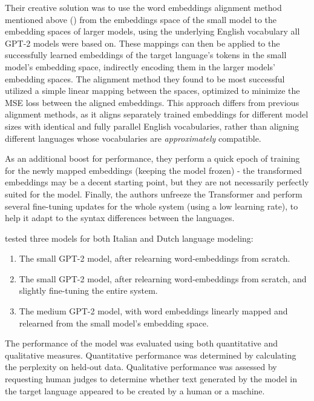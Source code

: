 \documentclass{article}
\begin{document}
\medskip
\noindent
Their creative solution was to use the word embeddings alignment method mentioned above (\citet{rudertheman}) from the embeddings space of the small model to the embedding spaces of larger models, using the underlying English vocabulary all GPT-2 models were based on. These mappings can then be applied to the successfully learned embeddings of the target language's tokens in the small model's embedding space, indirectly encoding them in the larger models' embedding spaces. The alignment method they found to be most successful utilized a simple linear mapping between the spaces, optimized to minimize the MSE loss between the aligned embeddings. This approach differs from previous alignment methods, as it aligns separately trained embeddings for different model sizes with identical and fully parallel English vocabularies, rather than aligning different languages whose vocabularies are \emph{approximately} compatible.

\medskip
\noindent
As an additional boost for performance, they perform a quick epoch of training for the newly mapped embeddings (keeping the model frozen) - the transformed embeddings may be a decent starting point, but they are not necessarily perfectly suited for the model. Finally, the authors unfreeze the Transformer and perform several fine-tuning updates for the whole system (using a low learning rate), to help it adapt to the syntax differences between the languages.

\medskip
\noindent
\citet{deVries2020recycle} tested three models for both Italian and Dutch language modeling:
\begin{enumerate}
    \item
        The small GPT-2 model, after relearning word-embeddings from scratch.
    \item
        The small GPT-2 model, after relearning word-embeddings from scratch, and slightly fine-tuning the entire system.
    \item
        The medium GPT-2 model, with word embeddings linearly mapped and relearned from the small model's embedding space.
\end{enumerate}

\medskip
\noindent
The performance of the model was evaluated using both quantitative and qualitative measures. Quantitative performance was determined by calculating the perplexity on held-out data. Qualitative performance was assessed by requesting human judges to determine whether text generated by the model in the target language appeared to be created by a human or a machine.
\end{document}
